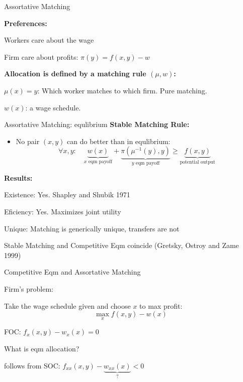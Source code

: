 \documentclass{beamer}%
\begin{document}
\begin{frame}{Assortative Matching}

\textbf{Preferences:}
\begin{midi}
\item Workers care about the wage
\item Firm care about profits: $\pi(y) = f(x,y) - w$
\end{midi}
\medskip
\textbf{Allocation is defined by a matching rule $(\mu,w)$:}
\begin{midi}
\item $\mu(x) = y$: Which worker matches to which firm. Pure matching.
\item $w(x)$: a wage schedule.
\end{midi}
\end{frame}


\begin{frame}{Assortative Matching: equlibrium}
\textbf{Stable Matching Rule:}
\begin{itemize}
\item No pair $(x,y)$ can do better than in equlibrium:
\begin{equation*}
\forall x,y: \quad \underbrace{w(x)}_{x\text{ eqm payoff}} + \underbrace{\pi(\mu^{-1}(y),y)}_{y \text{ eqm payoff}} \geq \underbrace{f(x,y)}_\text{potential output}
\end{equation*}
\end{itemize}

\textbf{Results:}
\begin{midi}
\item Existence: Yes. Shapley and Shubik 1971
\item Eficiency: Yes. Maximizes joint utility
\item Unique: Matching is generically unique, transfers are not
\item Stable Matching and Competitive Eqm coincide (Gretsky, Ostroy and Zame 1999)
\end{midi}
\end{frame}


\begin{frame}{Competitive Eqm and Assortative Matching}
\begin{midi}
\item Firm's problem:
\begin{midi}
\item Take the wage schedule given and choose $x$ to max profit:
\begin{equation*}
\max_x f(x,y) - w(x)
\end{equation*}
\item FOC: $f_x(x,y) - w_x(x) = 0$
\item What is eqm allocation?
\item follows from SOC: $f_{xx}(x,y) - \underbrace{w_{xx}(x)}_\text{?} < 0$
\end{midi}
\end{midi}
\end{frame}
\end{document}
